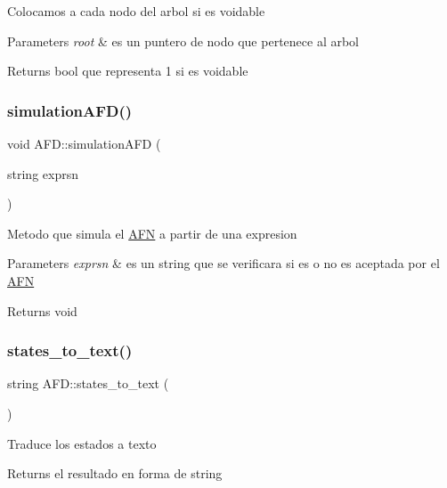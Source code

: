 Colocamos a cada nodo del arbol si es voidable 
\begin{DoxyParams}{Parameters}
{\em root} & es un puntero de nodo que pertenece al arbol \\
\hline
\end{DoxyParams}
\begin{DoxyReturn}{Returns}
bool que representa 1 si es voidable 
\end{DoxyReturn}
\hypertarget{class_a_f_d_a536493b9063f9e9c4eb734d3560f7a7d}{}\label{class_a_f_d_a536493b9063f9e9c4eb734d3560f7a7d} 
\subsubsection{\texorpdfstring{simulation\+A\+F\+D()}{simulationAFD()}}
{\footnotesize\ttfamily void A\+F\+D\+::simulation\+A\+FD (\begin{DoxyParamCaption}\item[{string}]{exprsn }\end{DoxyParamCaption})}

Metodo que simula el \hyperlink{class_a_f_n}{A\+FN} a partir de una expresion 
\begin{DoxyParams}{Parameters}
{\em exprsn} & es un string que se verificara si es o no es aceptada por el \hyperlink{class_a_f_n}{A\+FN} \\
\hline
\end{DoxyParams}
\begin{DoxyReturn}{Returns}
void 
\end{DoxyReturn}
\hypertarget{class_a_f_d_a8c3da4d57cbc9bae76e775cb6b216d64}{}\label{class_a_f_d_a8c3da4d57cbc9bae76e775cb6b216d64} 
\subsubsection{\texorpdfstring{states\+\_\+to\+\_\+text()}{states\_to\_text()}}
{\footnotesize\ttfamily string A\+F\+D\+::states\+\_\+to\+\_\+text (\begin{DoxyParamCaption}{ }\end{DoxyParamCaption})}

Traduce los estados a texto \begin{DoxyReturn}{Returns}
el resultado en forma de string 
\end{DoxyReturn}
\hypertarget{class_a_f_d_afee8c78c7a823e360e8e69136806e7c5}{}\label{class_a_f_d_afee8c78c7a823e360e8e69136806e7c5} 
